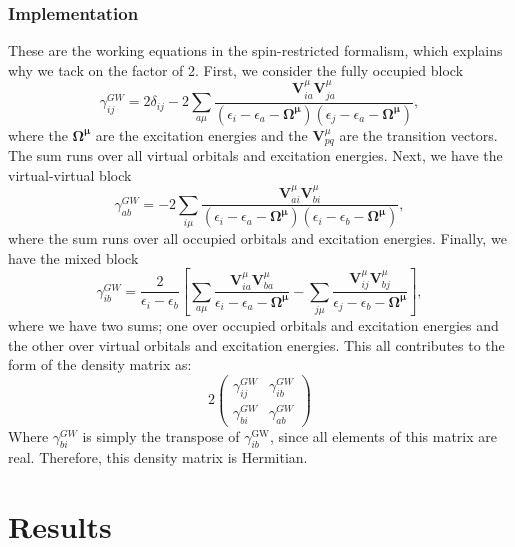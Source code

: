\documentclass[12pt]{caltech_thesis}
\begin{document}
\subsection{Implementation}
These are the working equations in the spin-restricted formalism, which explains why we tack on the factor of 2. First, we consider the fully occupied block
\begin{equation}
\gamma_{ij}^{GW}=2\delta_{ij}-2\sum_{a\mu} \frac{\textbf{V}_{ia}^\mu \textbf{V}_{ja}^\mu}{\left(\epsilon_{i}-\epsilon_{a}-\boldsymbol{\Omega ^{\mu}}\right)\left(\epsilon_{j}-\epsilon_{a}-\boldsymbol{\Omega ^{\mu}}\right)},
\end{equation}
where the $\boldsymbol{\Omega ^{\mu}}$ are the excitation energies and the $\textbf{V}_{pq}^{\mu}$ are the transition vectors. The sum runs over all virtual orbitals and excitation energies. Next, we have the virtual-virtual block
\begin{equation}
\gamma_{ab}^{GW}=-2\sum_{i\mu} \frac{\textbf{V}_{ai}^{\mu} \textbf{V}_{bi}^{\mu}}{\left(\epsilon_{i}-\epsilon_{a}-\boldsymbol{\Omega ^{\mu}}\right)\left(\epsilon_{i}-\epsilon_{b}-\boldsymbol{\Omega ^{\mu}}\right)},
\end{equation}
where the sum runs over all occupied orbitals and excitation energies.
Finally, we have the mixed block
\begin{equation}
    \gamma_{i b}^{G W}=\frac{2}{\epsilon_{i}-\epsilon_{b}}\left[ \sum_{a \mu} \frac{\textbf{V}_{i a}^{\mu} \textbf{V}_{b a}^{\mu}}{\epsilon_{i}-\epsilon_{a}-\boldsymbol{\Omega ^{\mu}}} - \sum_{j \mu} \frac{\textbf{V}_{i j}^{\mu} \textbf{V}_{bj}^{\mu}}{\epsilon_{j}-\epsilon_{b}-\boldsymbol{\Omega ^{\mu}}} \right],
\end{equation}
where we have two sums; one over occupied orbitals and excitation energies and the other over virtual orbitals and excitation energies.
This all contributes to the form of the density matrix as:
\begin{equation}
    2\begin{pmatrix}
        \gamma _{i j}^{G W} & \gamma _{i b}^{G W} \\
        \gamma _{bi}^{G W } & \gamma _{a b}^{G W}
    \end{pmatrix}
\end{equation}
Where $\gamma _{bi}^{G W }$ is simply the transpose of $\gamma _{ib}^{\text{GW}}$, since all elements of this matrix are real. Therefore, this density matrix is Hermitian.



\chapter{Results}
\end{document}
